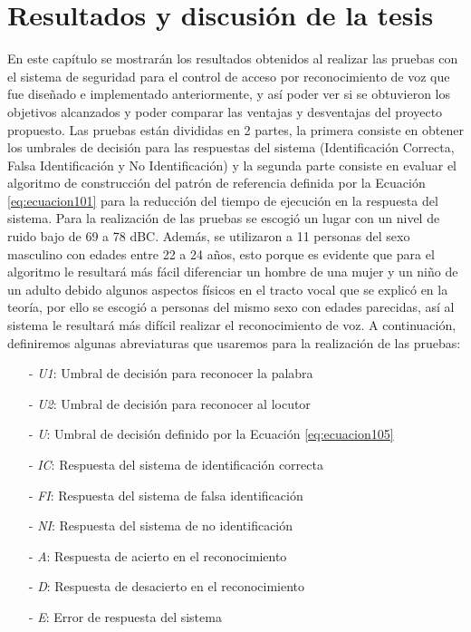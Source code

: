 \chapter{Resultados y discusión de la tesis}
En este capítulo se mostrarán los resultados obtenidos al realizar las pruebas con el sistema de seguridad para el control de acceso por reconocimiento de voz que fue diseñado e implementado anteriormente, y así poder ver si se obtuvieron los objetivos alcanzados y poder comparar las ventajas y desventajas del proyecto propuesto.
\vskip 0.5cm
Las pruebas están divididas en 2 partes, la primera consiste en obtener los umbrales de decisión para las respuestas del sistema (Identificación Correcta, Falsa Identificación y No Identificación) y la segunda parte consiste en evaluar el algoritmo de construcción del patrón de referencia definida por la Ecuación \eqref{eq:ecuacion101} para la reducción del tiempo de ejecución en la respuesta del sistema.
\vskip 0.5cm
Para la realización de las pruebas se escogió un lugar con un nivel de ruido bajo de 69 a 78 dBC. Además, se utilizaron a 11 personas del sexo masculino con edades entre 22 a 24 años, esto porque es evidente que para el algoritmo le resultará más fácil diferenciar un hombre de una mujer y un niño de un adulto debido algunos aspectos físicos en el tracto vocal que se explicó en la teoría, por ello se escogió a personas del mismo sexo con edades parecidas, así al sistema le resultará más difícil realizar el reconocimiento de voz. A continuación, definiremos algunas abreviaturas que usaremos para la realización de las pruebas:
\begin{enumerate}
\item[-]\textit{U1}: Umbral de decisión para reconocer la palabra
\item[-]\textit{U2}: Umbral de decisión para reconocer al locutor
\item[-]\textit{U}: Umbral de decisión definido por la Ecuación \eqref{eq:ecuacion105}
\item[-]\textit{IC}: Respuesta del sistema de identificación correcta
\item[-]\textit{FI}: Respuesta del sistema de falsa identificación
\item[-]\textit{NI}: Respuesta del sistema de no identificación
\item[-]\textit{A}: Respuesta de acierto en el reconocimiento
\item[-]\textit{D}: Respuesta de desacierto en el reconocimiento
\item[-]\textit{E}: Error de respuesta del sistema
\end{enumerate}
